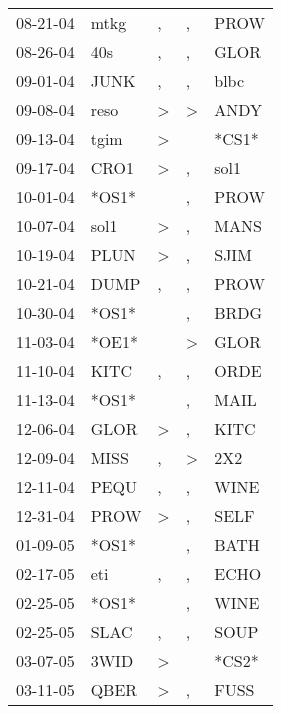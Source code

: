 \begin{supertabular}{lllll}
 08-21-04 &   mtkg &                , &                , &   PROW \\
 08-26-04 &    40s &                , &                , &   GLOR \\
 09-01-04 &   JUNK &                , &                , &   blbc \\
 09-08-04 &   reso &     \textgreater &     \textgreater &   ANDY \\
 09-13-04 &   tgim &     \textgreater &                  &  *CS1* \\
 09-17-04 &   CRO1 &     \textgreater &                , &   sol1 \\
 10-01-04 &  *OS1* &                  &                , &   PROW \\
 10-07-04 &   sol1 &     \textgreater &                , &   MANS \\
 10-19-04 &   PLUN &     \textgreater &                , &   SJIM \\
 10-21-04 &   DUMP &                , &                , &   PROW \\
 10-30-04 &  *OS1* &                  &                , &   BRDG \\
 11-03-04 &  *OE1* &                  &     \textgreater &   GLOR \\
 11-10-04 &   KITC &                , &                , &   ORDE \\
 11-13-04 &  *OS1* &                  &                , &   MAIL \\
 12-06-04 &   GLOR &     \textgreater &                , &   KITC \\
 12-09-04 &   MISS &                , &     \textgreater &    2X2 \\
 12-11-04 &   PEQU &                , &                , &   WINE \\
 12-31-04 &   PROW &     \textgreater &                , &   SELF \\
 01-09-05 &  *OS1* &                  &                , &   BATH \\
 02-17-05 &    eti &                , &                , &   ECHO \\
 02-25-05 &  *OS1* &                  &                , &   WINE \\
 02-25-05 &   SLAC &                , &                , &   SOUP \\
 03-07-05 &   3WID &     \textgreater &                  &  *CS2* \\
 03-11-05 &   QBER &     \textgreater &                , &   FUSS \\

\end{supertabular}
